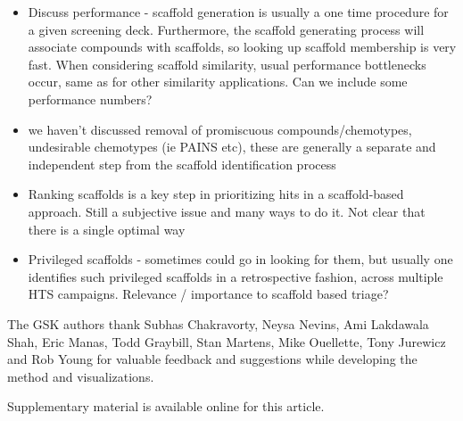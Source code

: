 \documentclass[journal=jacsat,manuscript=article]{achemso}
\begin{document}
\begin{itemize}
\item Discuss performance - scaffold generation is usually a one time procedure
  for a given screening deck. Furthermore, the scaffold generating process will
  associate compounds with scaffolds, so looking up scaffold membership is very
  fast. When considering scaffold similarity, usual performance bottlenecks
  occur, same as for other similarity applications. Can we include some
  performance numbers?
\item we haven't discussed removal of promiscuous compounds/chemotypes,
  undesirable chemotypes (ie PAINS etc), these are generally a separate and
  independent step from the scaffold identification process
\item Ranking scaffolds is a key step in prioritizing hits in a scaffold-based
  approach. Still a subjective issue and many ways to do it. Not clear that
  there is a single optimal way
\item Privileged scaffolds - sometimes could go in looking for them, but usually
  one identifies such privileged scaffolds in a retrospective fashion, across
  multiple HTS campaigns. Relevance / importance to scaffold based triage?
\end{itemize}

\begin{acknowledgement}
  The GSK authors thank Subhas Chakravorty, Neysa Nevins, Ami Lakdawala Shah,
  Eric Manas, Todd Graybill, Stan Martens, Mike Ouellette, Tony Jurewicz and Rob
  Young for valuable feedback and suggestions while developing the method and
  visualizations.
\end{acknowledgement}

\begin{suppinfo}
Supplementary material is available online for this article.
\end{suppinfo}


\end{document}
